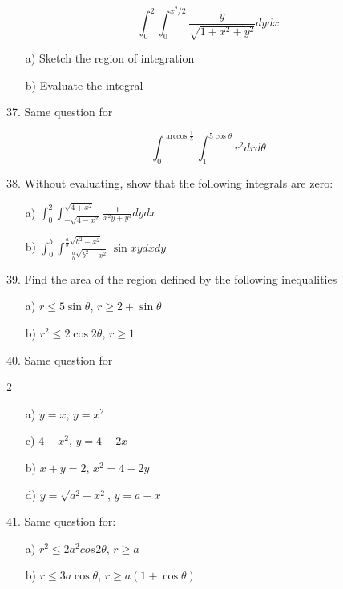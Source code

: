 \documentclass[11pt]{amsbook}
\begin{document}
    
    
    \[\int_0^2 \int_0^{x^2 / 2} \frac{y}{\sqrt{1 + x^2 + y^2}} dy dx \]
    
    \begin{enumerate}
        \item[a)] Sketch the region of integration
        \item[b)] Evaluate the integral
    \end{enumerate}
    
    37. Same question for 
    
    \[\int_0^{\arccos\frac{1}{5}} \int_1^{5\cos\theta} r^2 dr d\theta \]
    
    38. Without evaluating, show that the following integrals are zero:
    \begin{enumerate}
        \item[a)] $\int_0^2 \int_{-\sqrt{4 - x^2}}^{\sqrt{4 + x^2}} \frac{1}{x^2y + y^3} dy dx$
        \item[b)] $\int_0^b \int_{-\frac{a}{b}\sqrt{b^2 - x^2}}^{\frac{a}{b}\sqrt{b^2 - x^2}} \sin{xy} dx dy$
    \end{enumerate}
    
    39. Find the area of the region defined by the following inequalities
    \begin{enumerate}
        \item[a)] $r \leq 5\sin\theta$, $r \geq 2 + \sin\theta$
        \item[b)] $r^2 \leq 2\cos2\theta$, $r \geq 1$ 
    \end{enumerate}
    
    40. Same question for
    \begin {multicols}{2}
        \begin{enumerate}
            \item[a)] $y = x$, $y = x^2$
            \item[c)] $4 - x^2$, $y = 4 - 2x$
            \item[b)] $x + y = 2$, $x^2 = 4 - 2y$
            \item[d)] $y = \sqrt{a^2 - x^2}$, $y = a - x$
        \end{enumerate}
    \end{multicols}
    
    41. Same question for:
    \begin{multicols}{2}
        \begin{enumerate}
            \item[a)] $r^2 \leq 2a^2cos2\theta$, $r \geq a$
            \item[b)] $r \leq 3a\cos\theta$, $r \geq a(1 + \cos\theta)$
        \end{enumerate}
    \end{multicols}
    
\end{document}
